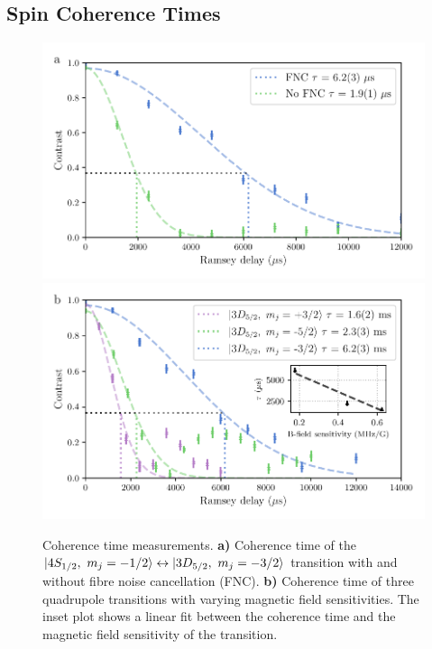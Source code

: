 \subsection{Spin Coherence Times}
\label{sec:Coherence}
    \begin{figure}
        \begin{center}
        \noindent\includegraphics[width=\linewidth]{
            figures/pdf_figure/fnc_coherence.pdf
            }
        \noindent\includegraphics[width=\linewidth]{
            figures/pdf_figure/mag_coherence.pdf
            }
        \end{center}
        \caption{Coherence time measurements.
        \textbf{a)} Coherence time of the $\ket{4S_{1/2},~m_j=-1/2}\leftrightarrow\ket{3D_{5/2},~m_j=-3/2}$ transition with and without fibre noise cancellation (FNC). 
        \textbf{b)} Coherence time of three quadrupole transitions with varying magnetic field sensitivities. The inset plot shows a linear fit between the coherence time and the magnetic field sensitivity of the transition.
            }
        \label{fig:coherence_times}
    \end{figure}
